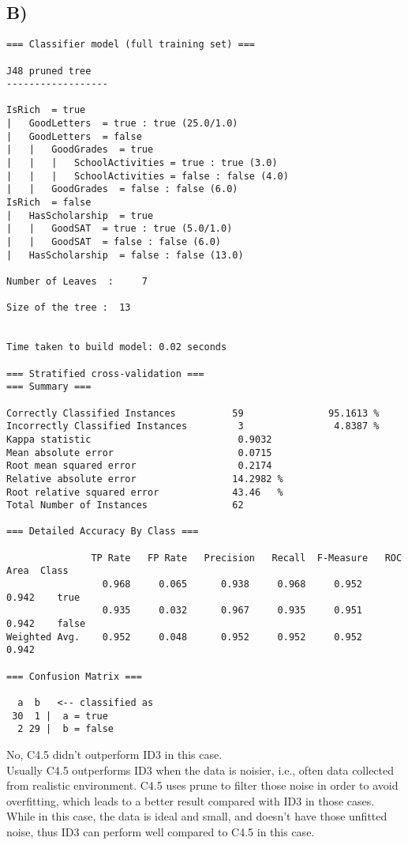 \documentclass[11pt]{article}
\begin{document}
\medskip

\subsection*{B)}
\begin{lstlisting}
=== Classifier model (full training set) ===

J48 pruned tree
------------------

IsRich  = true 
|   GoodLetters  = true : true (25.0/1.0)
|   GoodLetters  = false 
|   |   GoodGrades  = true 
|   |   |   SchoolActivities = true : true (3.0)
|   |   |   SchoolActivities = false : false (4.0)
|   |   GoodGrades  = false : false (6.0)
IsRich  = false 
|   HasScholarship  = true 
|   |   GoodSAT  = true : true (5.0/1.0)
|   |   GoodSAT  = false : false (6.0)
|   HasScholarship  = false : false (13.0)

Number of Leaves  : 	7

Size of the tree : 	13


Time taken to build model: 0.02 seconds

=== Stratified cross-validation ===
=== Summary ===

Correctly Classified Instances          59               95.1613 %
Incorrectly Classified Instances         3                4.8387 %
Kappa statistic                          0.9032
Mean absolute error                      0.0715
Root mean squared error                  0.2174
Relative absolute error                 14.2982 %
Root relative squared error             43.46   %
Total Number of Instances               62     

=== Detailed Accuracy By Class ===

               TP Rate   FP Rate   Precision   Recall  F-Measure   ROC Area  Class
                 0.968     0.065      0.938     0.968     0.952      0.942    true
                 0.935     0.032      0.967     0.935     0.951      0.942    false
Weighted Avg.    0.952     0.048      0.952     0.952     0.952      0.942

=== Confusion Matrix ===

  a  b   <-- classified as
 30  1 |  a = true
  2 29 |  b = false
\end{lstlisting}

\noindent No, C4.5 didn't outperform ID3 in this case.\\
Usually C4.5 outperforms ID3 when the data is noisier, i.e., often data collected from realistic environment. C4.5 uses prune to filter those noise in order to avoid overfitting, which leads to a better result compared with ID3 in those cases. While in this case, the data is ideal and small, and doesn't have those unfitted noise, thus ID3 can perform well compared to C4.5 in this case.\\
\end{document}

